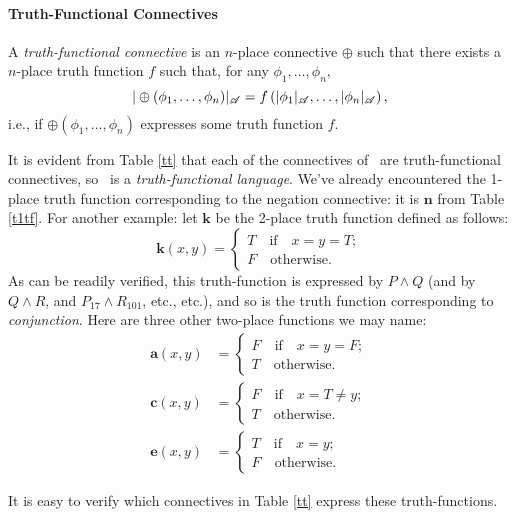 \paragraph{Truth-Functional Connectives}
\begin{definition}\label{tfc}
	A \emph{truth-functional connective} is an $n$-place connective $\oplus$ such that there exists a $n$-place truth function $f$ such that, for any $\phi_{1},\ldots,\phi_{n}$, $$|\oplus(\phi_{1},\ldots,\phi_{n})|_{\mathscr{A}} = f\left(|\phi_{1}|_{\mathscr{A}},\ldots,|\phi_{n}|_{\mathscr{A}}\right),$$ i.e., if $\oplus(\phi_{1},\ldots,\phi_{n})$ expresses some truth function $f$. 
\end{definition}
It is evident from Table \ref{tt}  that each of the connectives of \lone\ are truth-functional connectives, so \lone\ is a \emph{truth-functional language}. We've already encountered the 1-place truth function corresponding to the negation connective: it is $\mathbf{n}$ from Table \ref{t1tf}. For another example: let $\mathbf{k}$ be the 2-place truth function defined as follows: $$\mathbf{k}(x,y) = \begin{cases} T \quad\text{if}\quad x = y = T;\\
F \quad\text{otherwise}.\end{cases}$$ As can be readily verified, this truth-function is expressed by $P \wedge Q$ (and by $Q \wedge R$, and $P_{17} \wedge R_{101}$, etc., etc.), and so is the truth function corresponding to \emph{conjunction}. Here are three other two-place functions we may name:
\begin{align*}
	\mathbf{a}(x,y) &= \begin{cases} F \quad\text{if}\quad x =  y = F;\\ 
T \quad\text{otherwise}.\end{cases}\\
 \mathbf{c}(x,y) &= \begin{cases} F \quad\text{if}\quad x = T \neq y;\\
T \quad\text{otherwise}.\end{cases}\\
\mathbf{e}(x,y) &= \begin{cases} T \quad\text{if}\quad x = y;\\
F \quad\text{otherwise}.\end{cases}
\end{align*}

It is easy to verify which connectives in Table \ref{tt} express these truth-functions.

